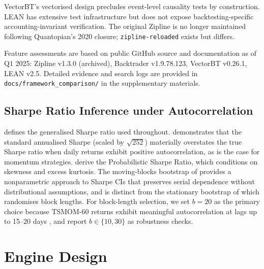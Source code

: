 \documentclass[12pt]{article}
\begin{document}
\begin{table}[H]
\begin{tabular}{lccccc}
\bottomrule
\end{tabular}
\begin{tablenotes}\footnotesize
\item VectorBT's vectorised design precludes event-level causality tests
by construction. LEAN has extensive test infrastructure but does not
expose backtesting-specific accounting-invariant verification. The
original Zipline \citep{zipline} is no longer maintained following
Quantopian's 2020 closure; \texttt{zipline-reloaded} exists but differs.
\item Feature assessments are based on public GitHub source and documentation
as of Q1 2025: Zipline v1.3.0 (archived), Backtrader v1.9.78.123,
VectorBT v0.26.1, LEAN v2.5. Detailed evidence and search logs
are provided in \texttt{docs/framework\_comparison/} in the supplementary materials.
\end{tablenotes}
\end{table}

\subsection{Sharpe Ratio Inference under Autocorrelation}

\citet{sharpe1994sharpe} defines the generalised Sharpe ratio used
throughout. \citet{lo2002statistics} demonstrates that the standard
annualised Sharpe (scaled by $\sqrt{252}$) materially overstates the
true Sharpe ratio when daily returns exhibit positive autocorrelation,
as is the case for momentum strategies. \citet{bailey2012sharpe} derive
the Probabilistic Sharpe Ratio, which conditions on skewness and excess
kurtosis. The moving-blocks bootstrap of \citet{kunsch1989jackknife}
provides a nonparametric approach to Sharpe CIs that preserves serial
dependence without distributional assumptions, and is distinct from
the stationary bootstrap of \citet{politis1994stationary} which
randomises block lengths. For block-length selection, we set $b = 20$
as the primary choice because TSMOM-60 returns exhibit meaningful
autocorrelation at lags up to 15--20 days \citep{lo2002statistics},
and report $b \in \{10, 30\}$ as robustness checks.


\section{Engine Design}
\label{sec:design}
\end{document}
